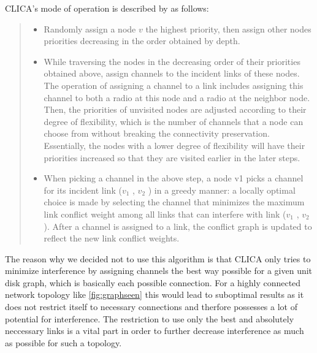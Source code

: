    CLICA's mode of operation is described by \cite{overview_caa} as follows:
    \begin{quote}
      \begin{itemize}
	\item Randomly assign a node \(v\) the highest priority, then assign other
	  nodes priorities decreasing in the order obtained by depth.
	  
	\item While traversing the nodes in the decreasing order of their
	  priorities obtained above, assign channels to the incident links
	  of these nodes. The operation of assigning a channel to a link
	  includes assigning this channel to both a radio at this node and
	  a radio at the neighbor node. Then, the priorities of unvisited
	  nodes are adjusted according to their degree of flexibility, which
	  is the number of channels that a node can choose from without
	  breaking the connectivity preservation. Essentially, the nodes
	  with a lower degree of flexibility will have their priorities
	  increased so that they are visited earlier in the later steps.
	  
	\item When picking a channel in the above step, a node v1 picks
	  a channel for its incident link (\(v_1\) , \(v_2\) ) in a greedy manner: a
	  locally optimal choice is made by selecting the channel that
	  minimizes the maximum link conflict weight among all links
	  that can interfere with link (\(v_1\) , \(v_2\) ). After a channel is assigned
	  to a link, the conflict graph is updated to reflect the new link conflict weights.
      \end{itemize}
    \end{quote}
  
    The reason why we decided not to use this algorithm is that \ac{CLICA} only tries to minimize interference by assigning channels the best way possible for a given
    unit disk graph, which is basically each possible connection. For a highly connected network topology like \ref{fig:graphseen} this would lead to suboptimal results
    as it does not restrict itself to necessary connections and therfore possesses a lot of potential for interference.
    The restriction to use only the best and absolutely neccessary links is a vital part in order to 
    further decrease interference as much as possible for such a topology.
    
